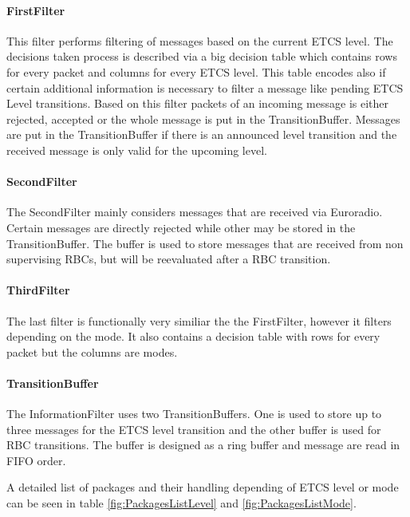 \paragraph{FirstFilter} This filter performs filtering of messages
based on the current ETCS level. The decisions taken process is
described via a big decision table which contains rows for every
packet and columns for every ETCS level. This table encodes also if
certain additional information is necessary to filter a message like
pending ETCS Level transitions. Based on this filter packets of an
incoming message is either rejected, accepted or the whole message is
put in the TransitionBuffer. Messages are put in the TransitionBuffer
if there is an announced level transition and the received message is
only valid for the upcoming level.

\paragraph{SecondFilter} The SecondFilter mainly considers messages
that are received via Euroradio. Certain messages are directly
rejected while other may be stored in the TransitionBuffer. The buffer
is used to store messages that are received from non supervising RBCs,
but will be reevaluated after a RBC transition.

\paragraph{ThirdFilter} The last filter is functionally very similiar
the the FirstFilter, however it filters depending on the mode. It also
contains a decision table with rows for every packet but the columns
are modes.

\paragraph{TransitionBuffer} The InformationFilter uses two
TransitionBuffers. One is used to store up to three messages for the
ETCS level transition and the other buffer is used for RBC
transitions. The buffer is designed as a ring buffer and message are
read in FIFO order.

A detailed list of packages and their handling depending of ETCS level
or mode can be seen in table \ref{fig:PackagesListLevel} and
\ref{fig:PackagesListMode}.


